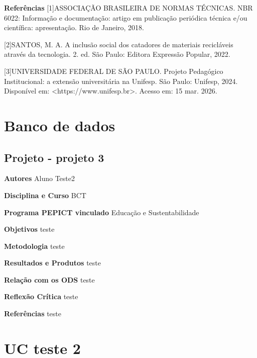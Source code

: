 \documentclass[12pt,openright,oneside,a4paper]{report}
\begin{document}
\vspace{0.7cm}
\noindent
\textbf{Referências}
[1]ASSOCIAÇÃO BRASILEIRA DE NORMAS TÉCNICAS. NBR 6022: Informação e documentação: artigo em
publicação periódica técnica e/ou científica: apresentação. Rio de Janeiro, 2018.

[2]SANTOS, M. A. A inclusão social dos catadores de materiais recicláveis através da tecnologia. 2. ed. São
Paulo: Editora Expressão Popular, 2022.

[3]UNIVERSIDADE FEDERAL DE SÃO PAULO. Projeto Pedagógico Institucional: a extensão universitária na
Unifesp. São Paulo: Unifesp, 2024. Disponível em: <https://www.unifesp.br>. Acesso em: 15 mar. 2026.

\vspace{0.7cm}
\chapter{Banco de dados}

\newpage
\section{Projeto - projeto 3}
\noindent
\textbf{Autores}
Aluno Teste2

\vspace{0.7cm}
\noindent
\textbf{Disciplina e Curso}
BCT

\vspace{0.7cm}
\noindent
\textbf{Programa PEPICT vinculado}
Educação e Sustentabilidade

\vspace{0.7cm}
\noindent
\textbf{Objetivos}
teste

\vspace{0.7cm}
\noindent
\textbf{Metodologia}
teste

\vspace{0.7cm}
\noindent
\textbf{Resultados e Produtos}
teste

\vspace{0.7cm}
\noindent
\textbf{Relação com os ODS}
teste

\vspace{0.7cm}
\noindent
\textbf{Reflexão Crítica}
teste

\vspace{0.7cm}
\noindent
\textbf{Referências}
teste

\vspace{0.7cm}
\chapter{UC teste 2}
\end{document}
